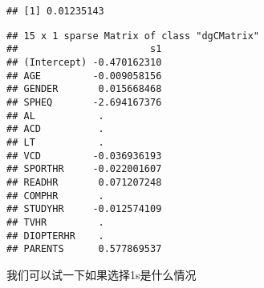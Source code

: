 \documentclass[]{ctexbook}
\newenvironment{Shaded}{\begin{snugshade}}{\end{snugshade}}
\newcommand{\AttributeTok}[1]{\textcolor[rgb]{0.77,0.63,0.00}{#1}}
\newcommand{\CommentTok}[1]{\textcolor[rgb]{0.56,0.35,0.01}{\textit{#1}}}
\newcommand{\FloatTok}[1]{\textcolor[rgb]{0.00,0.00,0.81}{#1}}
\newcommand{\FunctionTok}[1]{\textcolor[rgb]{0.00,0.00,0.00}{#1}}
\newcommand{\NormalTok}[1]{#1}
\newcommand{\OtherTok}[1]{\textcolor[rgb]{0.56,0.35,0.01}{#1}}
\newcommand{\SpecialCharTok}[1]{\textcolor[rgb]{0.00,0.00,0.00}{#1}}
\begin{document}
\begin{Shaded}
\end{Shaded}

\begin{verbatim}
## [1] 0.01235143
\end{verbatim}

\begin{Shaded}
\end{Shaded}

\begin{verbatim}
## 15 x 1 sparse Matrix of class "dgCMatrix"
##                       s1
## (Intercept) -0.470162310
## AGE         -0.009058156
## GENDER       0.015668468
## SPHEQ       -2.694167376
## AL           .          
## ACD          .          
## LT           .          
## VCD         -0.036936193
## SPORTHR     -0.022001607
## READHR       0.071207248
## COMPHR       .          
## STUDYHR     -0.012574109
## TVHR         .          
## DIOPTERHR    .          
## PARENTS      0.577869537
\end{verbatim}

我们可以试一下如果选择1s是什么情况

\begin{Shaded}
\end{Shaded}
\end{document}
